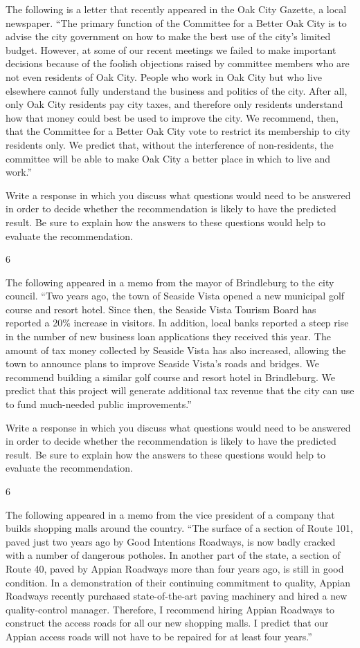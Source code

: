 \documentclass[]{article}
\begin{document}
The following is a letter that recently appeared in the Oak City
Gazette, a local newspaper. ``The primary function of the Committee for
a Better Oak City is to advise the city government on how to make the
best use of the city's limited budget. However, at some of our recent
meetings we failed to make important decisions because of the foolish
objections raised by committee members who are not even residents of Oak
City. People who work in Oak City but who live elsewhere cannot fully
understand the business and politics of the city. After all, only Oak
City residents pay city taxes, and therefore only residents understand
how that money could best be used to improve the city. We recommend,
then, that the Committee for a Better Oak City vote to restrict its
membership to city residents only. We predict that, without the
interference of non-residents, the committee will be able to make Oak
City a better place in which to live and work.''

Write a response in which you discuss what questions would need to be
answered in order to decide whether the recommendation is likely to have
the predicted result. Be sure to explain how the answers to these
questions would help to evaluate the recommendation.

6

The following appeared in a memo from the mayor of Brindleburg to the
city council. ``Two years ago, the town of Seaside Vista opened a new
municipal golf course and resort hotel. Since then, the Seaside Vista
Tourism Board has reported a 20\% increase in visitors. In addition,
local banks reported a steep rise in the number of new business loan
applications they received this year. The amount of tax money collected
by Seaside Vista has also increased, allowing the town to announce plans
to improve Seaside Vista's roads and bridges. We recommend building a
similar golf course and resort hotel in Brindleburg. We predict that
this project will generate additional tax revenue that the city can use
to fund much-needed public improvements.''

Write a response in which you discuss what questions would need to be
answered in order to decide whether the recommendation is likely to have
the predicted result. Be sure to explain how the answers to these
questions would help to evaluate the recommendation.

6

The following appeared in a memo from the vice president of a company
that builds shopping malls around the country. ``The surface of a
section of Route 101, paved just two years ago by Good Intentions
Roadways, is now badly cracked with a number of dangerous potholes. In
another part of the state, a section of Route 40, paved by Appian
Roadways more than four years ago, is still in good condition. In a
demonstration of their continuing commitment to quality, Appian Roadways
recently purchased state-of-the-art paving machinery and hired a new
quality-control manager. Therefore, I recommend hiring Appian Roadways
to construct the access roads for all our new shopping malls. I predict
that our Appian access roads will not have to be repaired for at least
four years.''
\end{document}
